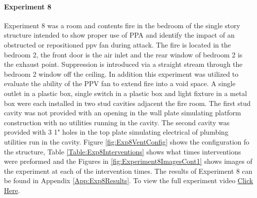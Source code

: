 \documentclass{article}
\begin{document}
\paragraph{Experiment 8}\mbox{}

Experiment 8 was a room and contents fire in the bedroom of the single story structure intended to show proper use of PPA and identify the impact of an obstructed or repositioned ppv fan during attack. The fire is located in the bedroom 2, the front door is the air inlet and the rear window of bedroom 2 is the exhaust point. Suppression is introduced via a straight stream through the bedroom 2 window off the ceiling. In addition this experiment was utilized to evaluate the ability of the PPV fan to extend fire into a void space. A single outlet in a plastic box, single switch in a plastic box and light fixture in a metal box were each installed in two stud cavities adjacent the fire room. The first stud cavity was not provided with an opening in the wall plate simulating platform construction with no utilities running in the cavity. The second cavity was provided with 3 1" holes in the top plate simulating electrical of plumbing utilities run in the cavity. Figure \ref{fig:Exp8VentConfig} shows the configuration fo the structure, Table \ref{Table:Exp8Interventions} shows what times interventions were preformed and the Figures in \ref{fig:Experiment8ImagesCont1} shows images of the experiment at each of the intervention times. The results of Experiment 8 can be found in Appendix \ref{App:Exp8Results}. To view the full experiment video \href{https://youtu.be/OzkzBTcsMs0}{Click Here}.
\end{document}
